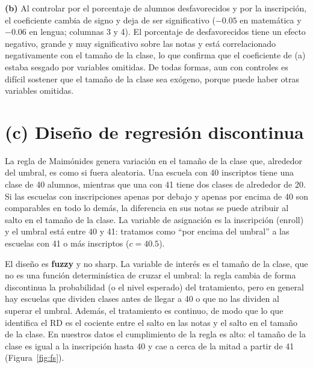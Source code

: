 \documentclass[11pt,a4paper]{article}
\begin{document}
\textbf{(b)} Al controlar por el porcentaje de alumnos desfavorecidos y por la inscripción, el coeficiente cambia de signo y deja de ser significativo ($-0.05$ en matemática y $-0.06$ en lengua; columnas 3 y 4). El porcentaje de desfavorecidos tiene un efecto negativo, grande y muy significativo sobre las notas y está correlacionado negativamente con el tamaño de la clase, lo que confirma que el coeficiente de (a) estaba sesgado por variables omitidas. De todas formas, aun con controles es difícil sostener que el tamaño de la clase sea exógeno, porque puede haber otras variables omitidas.

\section*{(c) Diseño de regresión discontinua}

La regla de Maimónides genera variación en el tamaño de la clase que, alrededor del umbral, es como si fuera aleatoria. Una escuela con 40 inscriptos tiene una clase de 40 alumnos, mientras que una con 41 tiene dos clases de alrededor de 20. Si las escuelas con inscripciones apenas por debajo y apenas por encima de 40 son comparables en todo lo demás, la diferencia en sus notas se puede atribuir al salto en el tamaño de la clase. La variable de asignación es la inscripción ($\text{enroll}$) y el umbral está entre 40 y 41: tratamos como ``por encima del umbral'' a las escuelas con 41 o más inscriptos ($c=40.5$).

El diseño es \textbf{fuzzy} y no sharp. La variable de interés es el tamaño de la clase, que no es una función determinística de cruzar el umbral: la regla cambia de forma discontinua la probabilidad (o el nivel esperado) del tratamiento, pero en general hay escuelas que dividen clases antes de llegar a 40 o que no las dividen al superar el umbral. Además, el tratamiento es continuo, de modo que lo que identifica el RD es el cociente entre el salto en las notas y el salto en el tamaño de la clase. En nuestros datos el cumplimiento de la regla es alto: el tamaño de la clase es igual a la inscripción hasta 40 y cae a cerca de la mitad a partir de 41 (Figura~\ref{fig:fs}).
\end{document}
